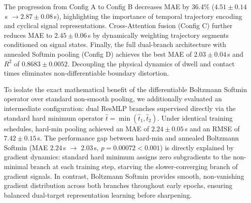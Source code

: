 \documentclass[journal]{IEEEtran}
\begin{document}
\begin{table}[!t]
\centering
\caption{Modular Ablation Study of VaT-Min Components (Mean $\pm$ Standard Deviation across 5 Seeds).}
\label{tab:ablation}
\end{table}

The progression from Config A to Config B decreases MAE by 36.4\% ($4.51 \pm 0.14$\,s $\to 2.87 \pm 0.08$\,s), highlighting the importance of temporal trajectory encoding and cyclical signal representations. Cross-Attention fusion (Config C) further reduces MAE to $2.45 \pm 0.06$\,s by dynamically weighting trajectory segments conditioned on signal states. Finally, the full dual-branch architecture with annealed Softmin pooling (Config D) achieves the best MAE of $2.03 \pm 0.04$\,s and $R^2$ of $0.8683 \pm 0.0052$. Decoupling the physical dynamics of dwell and contact times eliminates non-differentiable boundary distortion.

To isolate the exact mathematical benefit of the differentiable Boltzmann Softmin operator over standard non-smooth pooling, we additionally evaluated an intermediate configuration: dual ResMLP branches supervised directly via the standard hard minimum operator $\hat{t} = \min(\hat{t}_1, \hat{t}_2)$. Under identical training schedules, hard-min pooling achieved an MAE of $2.24 \pm 0.05$\,s and an RMSE of $7.42 \pm 0.15$\,s. The performance gap between hard-min and annealed Boltzmann Softmin (MAE $2.24$\,s $\to$ $2.03$\,s, $p = 0.00072 < 0.001$) is directly explained by gradient dynamics: standard hard minimum assigns zero subgradients to the non-minimal branch at each training step, starving the slower-converging branch of gradient signals. In contrast, Boltzmann Softmin provides smooth, non-vanishing gradient distribution across both branches throughout early epochs, ensuring balanced dual-target representation learning before sharpening.
\end{document}
